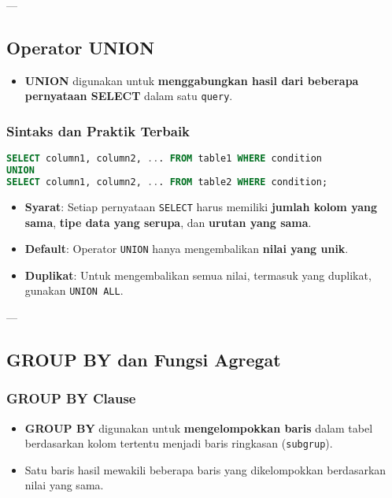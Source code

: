 \documentclass{article}
\begin{document}
---

\subsection{Operator UNION}
\begin{itemize}
    \item \textbf{UNION} digunakan untuk \textbf{menggabungkan hasil dari beberapa pernyataan SELECT} dalam satu \texttt{query}.
\end{itemize}

\subsubsection{Sintaks dan Praktik Terbaik}
\begin{lstlisting}[language=SQL, caption={Sintaks Dasar UNION}, captionpos=b]
SELECT column1, column2, ... FROM table1 WHERE condition  
UNION  
SELECT column1, column2, ... FROM table2 WHERE condition;
\end{lstlisting}
\begin{itemize}
    \item \textbf{Syarat}: Setiap pernyataan \texttt{SELECT} harus memiliki \textbf{jumlah kolom yang sama}, \textbf{tipe data yang serupa}, dan \textbf{urutan yang sama}.
    \item \textbf{Default}: Operator \texttt{UNION} hanya mengembalikan \textbf{nilai yang unik}.
    \item \textbf{Duplikat}: Untuk mengembalikan semua nilai, termasuk yang duplikat, gunakan \texttt{UNION ALL}.
\end{itemize}

---

\subsection{GROUP BY dan Fungsi Agregat}

\subsubsection{GROUP BY Clause}
\begin{itemize}
    \item \textbf{GROUP BY} digunakan untuk \textbf{mengelompokkan baris} dalam tabel berdasarkan kolom tertentu menjadi baris ringkasan (\texttt{subgrup}).
    \item Satu baris hasil mewakili beberapa baris yang dikelompokkan berdasarkan nilai yang sama.
\end{itemize}
\end{document}
